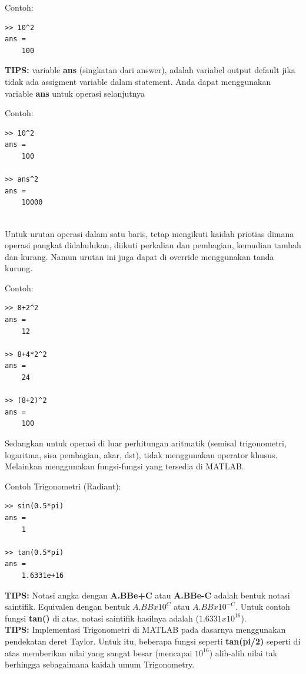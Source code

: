 \documentclass[12pt]{book}
\begin{document}
	Contoh:
	\begin{verbatim}
>> 10^2
ans =
    100
	\end{verbatim}

	\textbf{TIPS:} variable \textbf{ans} (singkatan dari answer), adalah variabel output default jika tidak ada assigment variable dalam statement.
	Anda dapat menggunakan variable \textbf{ans} untuk operasi selanjutnya

	Contoh:
	\begin{verbatim}
>> 10^2
ans =
    100

>> ans^2
ans =
    10000
	\end{verbatim}
	\\

	Untuk urutan operasi dalam satu baris, tetap mengikuti kaidah priotias dimana operasi pangkat didahulukan, diikuti perkalian dan pembagian, kemudian tambah dan kurang.
	Namun urutan ini juga dapat di override menggunakan tanda kurung.

	Contoh:
	\begin{verbatim}
>> 8+2^2
ans =
    12

>> 8+4*2^2
ans =
    24

>> (8+2)^2
ans =
    100
	\end{verbatim}

	Sedangkan untuk operasi di luar perhitungan aritmatik (semisal trigonometri, logaritma, sisa pembagian, akar, dst), tidak menggunakan operator khusus.
	Melainkan menggunakan fungsi-fungsi yang tersedia di MATLAB.

	Contoh Trigonometri (Radiant):
	\begin{verbatim}
>> sin(0.5*pi)
ans =
    1

>> tan(0.5*pi)
ans =
    1.6331e+16
	\end{verbatim}

	\textbf{TIPS:} Notasi angka dengan \textbf{A.BBe+C} atau \textbf{A.BBe-C} adalah bentuk notasi saintifik.
	Equivalen dengan bentuk $A.BB x 10^C$ atau $A.BB x 10^{-C}$.
	Untuk contoh fungsi \textbf{tan()} di atas, notasi saintifik hasilnya adalah (\textbf{$1.6331x10^{16}$}).\\

	\textbf{TIPS:} Implementasi Trigonometri di MATLAB pada dasarnya menggunakan pendekatan deret Taylor.
	Untuk itu, beberapa fungsi seperti \textbf{tan(pi/2)} seperti di atas memberikan nilai yang sangat besar (mencapai $10^{16}$)
	alih-alih nilai tak berhingga sebagaimana kaidah umum Trigonometry.
\end{document}

